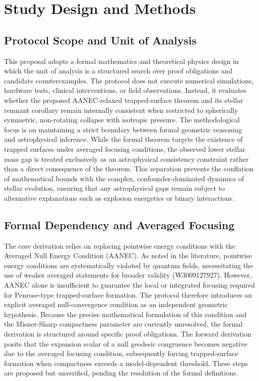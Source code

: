 \documentclass[conference]{IEEEtran}
\begin{document}
\section{Study Design and Methods}
\subsection{Protocol Scope and Unit of Analysis}
This proposal adopts a formal mathematics and theoretical physics design in which the unit of analysis is a structured search over proof obligations and candidate counterexamples. The protocol does not execute numerical simulations, hardware tests, clinical interventions, or field observations. Instead, it evaluates whether the proposed AANEC-relaxed trapped-surface theorem and its stellar remnant corollary remain internally consistent when restricted to spherically symmetric, non-rotating collapse with isotropic pressure. The methodological focus is on maintaining a strict boundary between formal geometric reasoning and astrophysical inference. While the formal theorem targets the existence of trapped surfaces under averaged focusing conditions, the observed lower stellar mass gap is treated exclusively as an astrophysical consistency constraint rather than a direct consequence of the theorem. This separation prevents the conflation of mathematical bounds with the complex, confounder-dominated dynamics of stellar evolution, ensuring that any astrophysical gaps remain subject to alternative explanations such as explosion energetics or binary interactions.

\subsection{Formal Dependency and Averaged Focusing}
The core derivation relies on replacing pointwise energy conditions with the Averaged Null Energy Condition (AANEC). As noted in the literature, pointwise energy conditions are systematically violated by quantum fields, necessitating the use of weaker averaged statements for broader validity (W3009127927). However, AANEC alone is insufficient to guarantee the local or integrated focusing required for Penrose-type trapped-surface formation. The protocol therefore introduces an explicit averaged null-convergence condition as an independent geometric hypothesis. Because the precise mathematical formulation of this condition and the Misner-Sharp compactness parameter are currently unresolved, the formal derivation is structured around specific proof obligations. The forward derivation posits that the expansion scalar of a null geodesic congruence becomes negative due to the averaged focusing condition, subsequently forcing trapped-surface formation when compactness exceeds a model-dependent threshold. These steps are proposed but unverified, pending the resolution of the formal definitions.~\cite{cite_0ed84243cf171bc4}
\end{document}
